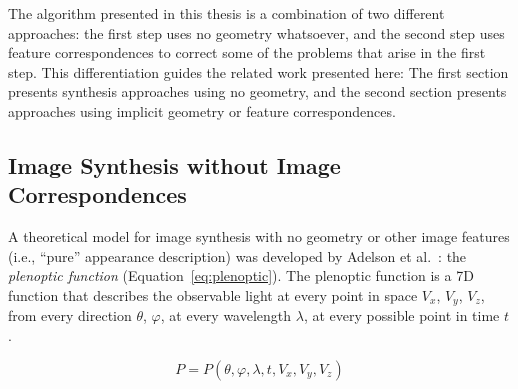 
The algorithm presented in this thesis is a combination of two different approaches: the first step uses no geometry whatsoever, and the second step uses feature correspondences to correct some of the problems that arise in the first step. This differentiation guides the related work presented here: The first section presents synthesis approaches using no geometry, and the second section presents approaches using implicit geometry or feature correspondences.


\subsection{Image Synthesis without Image Correspondences}
A theoretical model for image synthesis with no geometry or other image features (i.e., ``pure'' appearance description) was developed by Adelson et al.\ \cite{Adelson91}: the \emph{plenoptic function} (Equation~\ref{eq:plenoptic}). The plenoptic function is a 7D function that describes the observable light at every point in space $V_x$, $V_y$, $V_z$, from every direction $\theta$, $\varphi$, at every wavelength $\lambda$, at every possible point in time $t$.

\begin{equation}
  \label{eq:plenoptic}
  P = P(\theta, \varphi, \lambda, t, V_x, V_y, V_z)
\end{equation}

